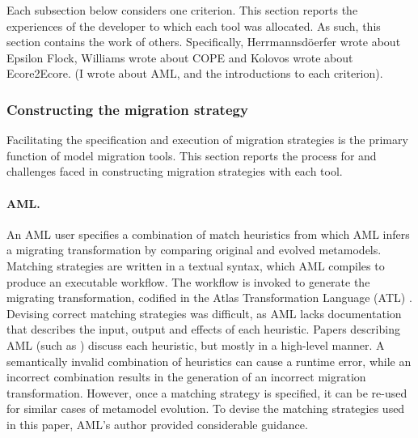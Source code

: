 Each subsection below considers one criterion. This section reports the experiences of the developer to which each tool was allocated. As such, this section contains the work of others. Specifically, Herrmannsd\"{o}erfer wrote about Epsilon Flock, Williams wrote about COPE and Kolovos wrote about Ecore2Ecore. (I wrote about AML, and the introductions to each criterion). 

\subsubsection{Constructing the migration strategy}
\label{subsec:constructing}
Facilitating the specification and execution of migration strategies is the primary function of model migration tools. This section reports the process for and challenges faced in constructing migration strategies with each tool.

\paragraph{AML.} An AML user specifies a combination of match heuristics from which AML infers a migrating transformation by comparing original and evolved metamodels. Matching strategies are written in a textual syntax, which AML compiles to produce an executable workflow. The workflow is invoked to generate the migrating transformation, codified in the Atlas Transformation Language (ATL) \cite{jouault05transforming}.
%
Devising correct matching strategies was difficult, as AML lacks documentation that describes the input, output and effects of each heuristic. Papers describing AML (such as \cite{garces09managing}) discuss each heuristic, but mostly in a high-level manner. A semantically invalid combination of heuristics can cause a runtime error, while an incorrect combination results in the generation of an incorrect migration transformation. However, once a matching strategy is specified, it can be re-used for similar cases of metamodel evolution. To devise the matching strategies used in this paper, AML's author provided considerable guidance.

